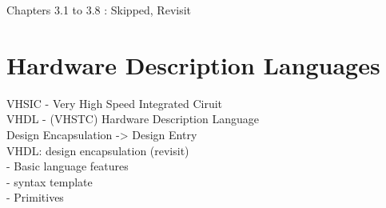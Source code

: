 Chapters 3.1 to 3.8 : Skipped, Revisit 
\section{Hardware Description Languages}
VHSIC - Very High Speed Integrated Ciruit\\
VHDL - (VHSTC) Hardware Description Language\\ 
Design Encapsulation -> Design Entry \\
VHDL: design encapsulation (revisit)\\
- Basic language features \\
- syntax template \\
- Primitives \\